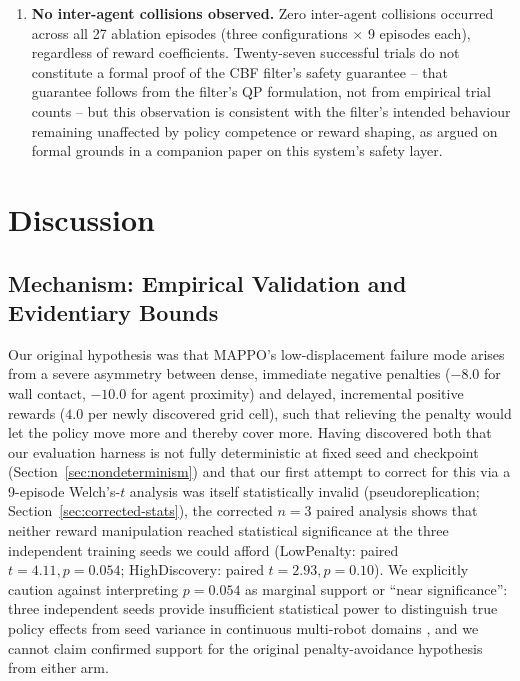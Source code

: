 \documentclass[11pt]{article}
\begin{document}
\begin{enumerate}
    not only coverage. Agent-agent collisions, however, remained at zero
    across all 27 ablation episodes regardless of reward coefficients or
    evaluation pass.
    \item \textbf{No inter-agent collisions observed.} Zero inter-agent
    collisions occurred across all 27 ablation episodes (three
    configurations $\times$ 9 episodes each), regardless of reward
    coefficients. Twenty-seven successful trials do not constitute a
    formal proof of the CBF filter's safety guarantee -- that guarantee
    follows from the filter's QP formulation, not from empirical trial
    counts -- but
    this observation is consistent with the filter's intended behaviour
    remaining unaffected by policy competence or reward shaping, as argued
    on formal grounds in a companion paper on this system's safety layer.
\end{enumerate}

\section{Discussion}
\label{sec:discussion}

\subsection{Mechanism: Empirical Validation and Evidentiary Bounds}
Our original hypothesis was that MAPPO's low-displacement failure mode
arises from a severe asymmetry between dense, immediate negative penalties
($-8.0$ for wall contact, $-10.0$ for agent proximity) and delayed,
incremental positive rewards ($4.0$ per newly discovered grid cell), such
that relieving the penalty would let the policy move more and thereby
cover more. Having discovered both that our evaluation harness is not
fully deterministic at fixed seed and checkpoint
(Section~\ref{sec:nondeterminism}) and that our first attempt to correct
for this via a 9-episode Welch's-$t$ analysis was itself statistically
invalid (pseudoreplication; Section~\ref{sec:corrected-stats}), the
corrected $n=3$ paired analysis shows that neither reward manipulation
reached statistical significance at the three independent training seeds we
could afford (LowPenalty: paired $t=4.11, p=0.054$; HighDiscovery: paired
$t=2.93, p=0.10$). We explicitly caution against interpreting $p=0.054$ as
marginal support or ``near significance'': three independent seeds
provide insufficient statistical power to distinguish true policy effects
from seed variance in continuous multi-robot domains \cite{henderson2018deep},
and we cannot claim confirmed support for the original penalty-avoidance
hypothesis from either arm.
\end{document}
